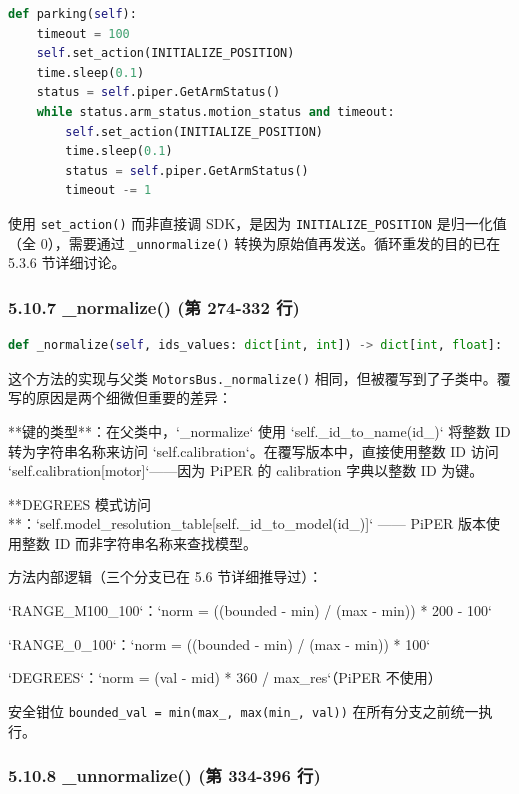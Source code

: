 \documentclass[UTF8,a4paper,11pt]{ctexart}
\begin{document}
{\begin{lstlisting}[language=python]
def parking(self):
    timeout = 100
    self.set_action(INITIALIZE_POSITION)
    time.sleep(0.1)
    status = self.piper.GetArmStatus()
    while status.arm_status.motion_status and timeout:
        self.set_action(INITIALIZE_POSITION)
        time.sleep(0.1)
        status = self.piper.GetArmStatus()
        timeout -= 1
\end{lstlisting}

使用 \texttt{set_action()} 而非直接调 SDK，是因为 \texttt{INITIALIZE_POSITION} 是归一化值（全 0），需要通过 \texttt{_unnormalize()} 转换为原始值再发送。循环重发的目的已在 5.3.6 节详细讨论。

\subsubsection{5.10.7 _normalize() (第 274-332 行)}

\begin{lstlisting}[language=python]
def _normalize(self, ids_values: dict[int, int]) -> dict[int, float]:
\end{lstlisting}

这个方法的实现与父类 \texttt{MotorsBus._normalize()} 相同，但被覆写到了子类中。覆写的原因是两个细微但重要的差异：

\item[1] **键的类型**：在父类中，`_normalize` 使用 `self._id_to_name(id_)` 将整数 ID 转为字符串名称来访问 `self.calibration`。在覆写版本中，直接使用整数 ID 访问 `self.calibration[motor]`——因为 PiPER 的 calibration 字典以整数 ID 为键。

\item[2] **DEGREES 模式访问**：`self.model_resolution_table[self._id_to_model(id_)]` —— PiPER 版本使用整数 ID 而非字符串名称来查找模型。

方法内部逻辑（三个分支已在 5.6 节详细推导过）：
\item `RANGE_M100_100`：`norm = ((bounded - min) / (max - min)) * 200 - 100`
\item `RANGE_0_100`：`norm = ((bounded - min) / (max - min)) * 100`
\item `DEGREES`：`norm = (val - mid) * 360 / max_res`（PiPER 不使用）

安全钳位 \texttt{bounded_val = min(max_, max(min_, val))} 在所有分支之前统一执行。

\subsubsection{5.10.8 _unnormalize() (第 334-396 行)}

}
\end{document}
